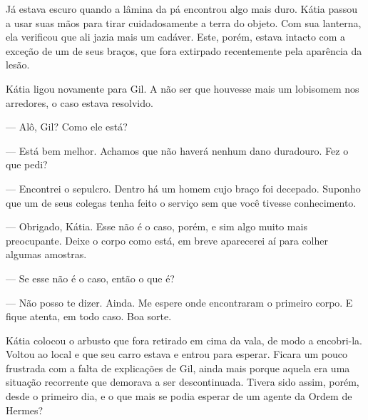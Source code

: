 Já estava escuro quando a lâmina da pá encontrou algo mais duro. Kátia
passou a usar suas mãos para tirar cuidadosamente a terra do objeto. Com
sua lanterna, ela verificou que ali jazia mais um cadáver. Este, porém,
estava intacto com a exceção de um de seus braços, que fora extirpado
recentemente pela aparência da lesão.

Kátia ligou novamente para Gil. A não ser que houvesse mais um lobisomem
nos arredores, o caso estava resolvido.

--- Alô, Gil? Como ele está?

--- Está bem melhor. Achamos que não haverá nenhum dano duradouro. Fez o
que pedi?

--- Encontrei o sepulcro. Dentro há um homem cujo braço foi decepado.
Suponho que um de seus colegas tenha feito o serviço sem que você
tivesse conhecimento.

--- Obrigado, Kátia. Esse não é o caso, porém, e sim algo muito mais
preocupante. Deixe o corpo como está, em breve aparecerei aí para colher
algumas amostras.

--- Se esse não é o caso, então o que é?

--- Não posso te dizer. Ainda. Me espere onde encontraram o primeiro
corpo. E fique atenta, em todo caso. Boa sorte.

Kátia colocou o arbusto que fora retirado em cima da vala, de modo a
encobri-la. Voltou ao local e que seu carro estava e entrou para
esperar. Ficara um pouco frustrada com a falta de explicações de Gil,
ainda mais porque aquela era uma situação recorrente que demorava a ser
descontinuada. Tivera sido assim, porém, desde o primeiro dia, e o que
mais se podia esperar de um agente da Ordem de Hermes?
